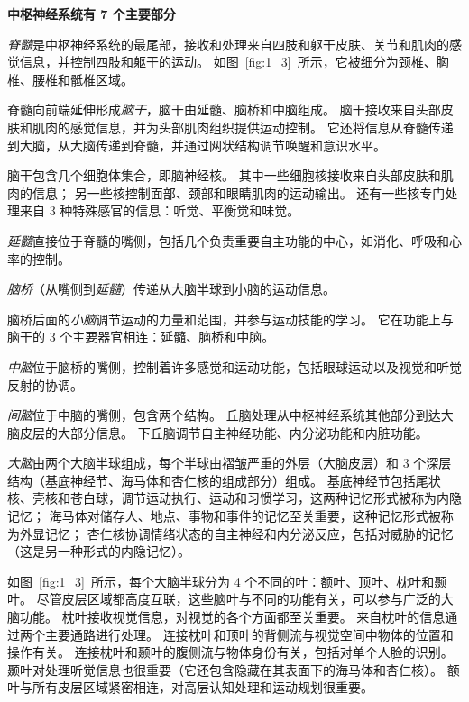 \begin{proposition}[中枢神经系统的解剖学组织] \label{box:1_2}
	\textbf{中枢神经系统有 7 个主要部分}
	
	\quad \quad \textit{脊髓}是中枢神经系统的最尾部，接收和处理来自四肢和躯干皮肤、关节和肌肉的感觉信息，并控制四肢和躯干的运动。
	如图~\ref{fig:1_3}~所示，它被细分为颈椎、胸椎、腰椎和骶椎区域。
	
	\quad \quad 脊髓向前端延伸形成\textit{脑干}，脑干由延髓、脑桥和中脑组成。
	脑干接收来自头部皮肤和肌肉的感觉信息，并为头部肌肉组织提供运动控制。
	它还将信息从脊髓传递到大脑，从大脑传递到脊髓，并通过网状结构调节唤醒和意识水平。
	
	\quad \quad 脑干包含几个细胞体集合，即脑神经核。
	其中一些细胞核接收来自头部皮肤和肌肉的信息；
	另一些核控制面部、颈部和眼睛肌肉的运动输出。
	还有一些核专门处理来自 3 种特殊感官的信息：听觉、平衡觉和味觉。
	
	\quad \quad \textit{延髓}直接位于脊髓的嘴侧，包括几个负责重要自主功能的中心，如消化、呼吸和心率的控制。
	
	\quad \quad \textit{脑桥}（从嘴侧到\textit{延髓}）传递从大脑半球到小脑的运动信息。
	
	\quad \quad 脑桥后面的\textit{小脑}调节运动的力量和范围，并参与运动技能的学习。
	它在功能上与脑干的 3 个主要器官相连：延髓、脑桥和中脑。
	
	\quad \quad \textit{中脑}位于脑桥的嘴侧，控制着许多感觉和运动功能，包括眼球运动以及视觉和听觉反射的协调。
	
	\quad \quad \textit{间脑}位于中脑的嘴侧，包含两个结构。
	丘脑处理从中枢神经系统其他部分到达大脑皮层的大部分信息。
	下丘脑调节自主神经功能、内分泌功能和内脏功能。
	
	\quad \quad \textit{大脑}由两个大脑半球组成，每个半球由褶皱严重的外层（大脑皮层）和 3 个深层结构（基底神经节、海马体和杏仁核的组成部分）组成。
	基底神经节包括尾状核、壳核和苍白球，调节运动执行、运动和习惯学习，这两种记忆形式被称为内隐记忆；
	海马体对储存人、地点、事物和事件的记忆至关重要，这种记忆形式被称为外显记忆；
	杏仁核协调情绪状态的自主神经和内分泌反应，包括对威胁的记忆（这是另一种形式的内隐记忆）。
	
	\quad \quad 如图~\ref{fig:1_3}~所示，每个大脑半球分为 4 个不同的叶：额叶、顶叶、枕叶和颞叶。
	尽管皮层区域都高度互联，这些脑叶与不同的功能有关，可以参与广泛的大脑功能。
	枕叶接收视觉信息，对视觉的各个方面都至关重要。
	来自枕叶的信息通过两个主要通路进行处理。
	连接枕叶和顶叶的背侧流与视觉空间中物体的位置和操作有关。
	连接枕叶和颞叶的腹侧流与物体身份有关，包括对单个人脸的识别。
	颞叶对处理听觉信息也很重要（它还包含隐藏在其表面下的海马体和杏仁核）。
	额叶与所有皮层区域紧密相连，对高层认知处理和运动规划很重要。
	

\end{proposition}
